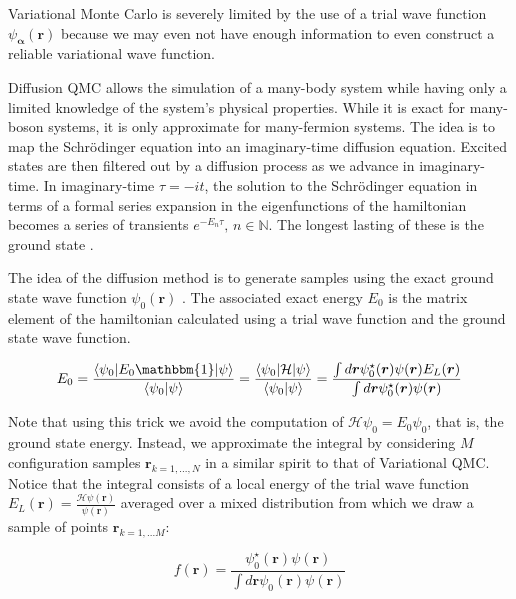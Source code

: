 Variational Monte Carlo is severely limited by the use of a trial wave function $\psi_{\bm \alpha} (\bm r)$ because we may even not have enough information to even construct a reliable variational wave function.

Diffusion \ac{QMC} allows the simulation of a many-body system while having only a limited knowledge of the system's physical properties.
While it is exact for many-boson systems, it is only approximate for many-fermion systems.
The idea is to map the Schr\"odinger equation into  an imaginary-time diffusion equation.
Excited states are then filtered out by a diffusion process as we advance in imaginary-time.
In imaginary-time $\tau = - i t$, the solution to the Schr\"odinger equation in terms of a formal series expansion in the eigenfunctions of the hamiltonian becomes a series of transients $e^{-E_n \tau}, \, n \in \mathbb{N}$.
The longest lasting of these is the ground state  \cite{kosztin_introduction_1996}.

The idea of the diffusion method is to generate samples using the exact ground state wave function $\psi_0 (\bm r)$ \cite{toulouse_chapter_2016}.
The associated exact energy $E_0$ is the matrix element of the hamiltonian calculated using a trial wave function and the ground state wave function.

\begin{equation}
E_0 = \frac{ \left\langle \psi_0 |E_0 \mathbbm{1} | \psi \right\rangle}{\left\langle \psi_0 | \psi \right\rangle} = \frac{\left\langle \psi_0 | \mathcal{H} | \psi \right\rangle}{ \left\langle\psi_0 | \psi \right\rangle} = \frac{\int d\bm r \psi_0^\star (\bm r) \psi (\bm r) E_L (\bm r)}{\int d\bm r\psi_0^\star (\bm r) \psi (\bm r)}
\end{equation}

Note that using this trick we avoid the computation of $\mathcal{H} \psi_0 = E_0 \psi_0$, that is, the ground state energy.
Instead, we approximate the integral by considering $M$ configuration samples $\bm r_{k = 1,..., N}$ in a similar spirit to that of Variational \ac{QMC}.
Notice that the integral consists of a local energy of the trial wave function $E_L (\bm r) = \frac{\mathcal{H} \psi (\bm r)}{\psi (\bm r)}$ averaged over a mixed distribution from which we draw a sample of points $\bm r_{k=1,...M}$:

\begin{equation}
f(\bm r) = \frac{\psi_0^\star (\bm r) \psi (\bm r) }{ \int d\bm r  \psi_0 (\bm r) \psi (\bm r)}
\end{equation}

